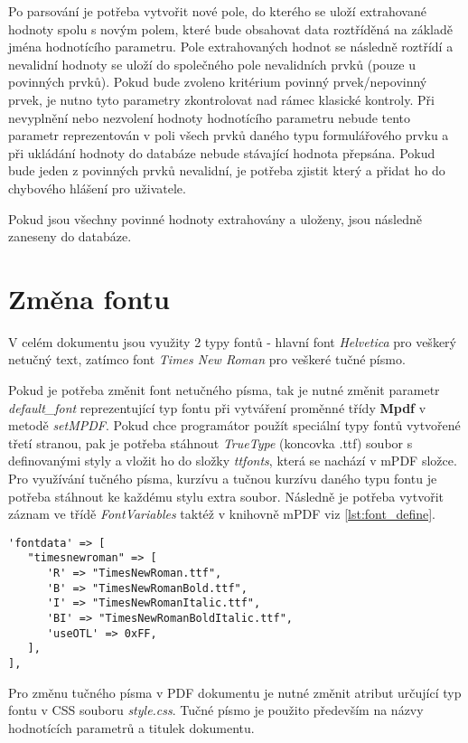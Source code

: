 Po parsování je potřeba vytvořit nové pole, do kterého se uloží extrahované hodnoty spolu s novým polem, které bude obsahovat data roztříděná na základě jména hodnotícího parametru. Pole extrahovaných hodnot se následně roztřídí a nevalidní hodnoty se uloží do společného pole nevalidních prvků (pouze u povinných prvků). Pokud bude zvoleno kritérium povinný prvek/nepovinný prvek, je nutno tyto parametry zkontrolovat nad rámec klasické kontroly. Při nevyplnění nebo nezvolení hodnoty hodnotícího parametru nebude tento parametr reprezentován v poli všech prvků daného typu formulářového prvku a při ukládání hodnoty do databáze nebude stávající hodnota přepsána. Pokud bude jeden z povinných prvků nevalidní, je potřeba zjistit který a přidat ho do chybového hlášení pro uživatele.
\par
Pokud jsou všechny povinné hodnoty extrahovány a uloženy, jsou následně zaneseny do databáze.

\section{Změna fontu}
V celém dokumentu jsou využity 2 typy fontů - hlavní font \textit{Helvetica} pro veškerý netučný text, zatímco font \textit{Times New Roman} pro veškeré tučné písmo.
\par
Pokud je potřeba změnit font netučného písma, tak je nutné změnit parametr \textit{default\_font} reprezentující typ fontu při vytváření proměnné třídy \textbf{Mpdf} v metodě \textit{setMPDF}. Pokud chce programátor použít speciální typy fontů vytvořené třetí stranou, pak je potřeba stáhnout \textit{TrueType} (koncovka .ttf) soubor s definovanými styly a vložit ho do složky \textit{ttfonts}, která se nachází v mPDF složce. Pro využívání tučného písma, kurzívu a tučnou kurzívu daného typu fontu je potřeba stáhnout ke každému stylu extra soubor. Následně je potřeba vytvořit záznam ve třídě \textit{FontVariables} taktéž v knihovně mPDF viz \ref{lst:font_define}.
\begin{lstlisting}[caption = {Nový záznam fontu v knihovně mPDF}, label = {lst:font_define}, captionpos=b]
'fontdata' => [
   "timesnewroman" => [
      'R' => "TimesNewRoman.ttf",
      'B' => "TimesNewRomanBold.ttf",
      'I' => "TimesNewRomanItalic.ttf",
      'BI' => "TimesNewRomanBoldItalic.ttf",
      'useOTL' => 0xFF,
   ],
],
\end{lstlisting}
\par
Pro změnu tučného písma v PDF dokumentu je nutné změnit atribut určující typ fontu v CSS souboru \textit{style.css}. Tučné písmo je použito především na názvy hodnotících parametrů a titulek dokumentu.

